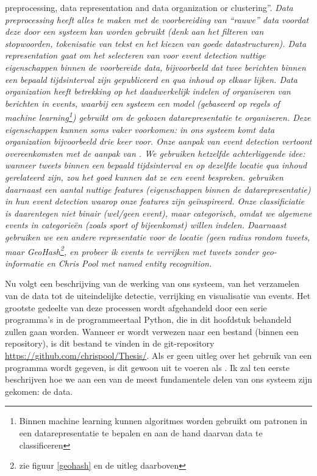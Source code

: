 {{{preprocessing, data representation and data organization or clustering''}. \it{Data 
preprocessing} heeft alles te maken met de voorbereiding van ``rauwe'' data voordat 
deze door een systeem kan worden gebruikt (denk aan het filteren van 
stopwoorden, tokenisatie van tekst en het kiezen van goede datastructuren). 
\it{Data representation} gaat om het selecteren van voor event detection nuttige 
eigenschappen binnen de voorbereide data, bijvoorbeeld dat twee berichten binnen 
een bepaald tijdsinterval zijn gepubliceerd en qua inhoud op elkaar lijken. \it{Data 
organization} heeft betrekking op het daadwerkelijk indelen of organiseren van 
berichten in events, waarbij een systeem een model (gebaseerd op regels of 
\it{machine learning}\footnote{Binnen machine learning kunnen algoritmes worden 
gebruikt om patronen in een datarepresentatie te bepalen en aan de hand daarvan
data te classificeren}) gebruikt om de gekozen datarepresentatie te organiseren. 
Deze eigenschappen kunnen soms vaker voorkomen: in ons systeem komt data organization
bijvoorbeeld drie keer voor.
\vl
Onze aanpak van event detection vertoont overeenkomsten met de aanpak van 
\citeauthor{walther2013geo}. We gebruiken hetzelfde achterliggende idee: wanneer tweets 
binnen een bepaald tijdsinterval en op dezelfde locatie qua inhoud gerelateerd 
zijn, zou het goed kunnen dat ze een event bespreken. \citeauthor{walther2013geo} gebruiken 
daarnaast een aantal nuttige \it{features} (eigenschappen binnen de datarepresentatie) in 
hun event detection waarop onze features zijn geïnspireerd. Onze classificiatie 
is daarentegen niet \it{binair} (wel/geen event), maar \it{categorisch}, omdat we algemene 
events in categorieën (zoals \it{sport} of \it{bijeenkomst}) willen indelen. Daarnaast gebruiken we een andere 
representatie voor de locatie (geen radius rondom tweets, maar \it{GeoHash}\footnote{zie 
figuur \ref{geohash} en de uitleg daarboven}, en probeer ik events te verrijken met tweets zonder geo-informatie en 
Chris Pool met named \it{entity recognition}.

\label{methode}

Nu volgt een beschrijving van de werking van ons systeem, van het verzamelen 
van de data tot de uiteindelijke detectie, verrijking en visualisatie van 
events. Het grootste gedeelte van deze processen wordt afgehandeld door een 
serie programma's in de programmeertaal Python, die in dit hoofdstuk behandeld 
zullen gaan worden. Wanneer er wordt verwezen naar een bestand (binnen een 
repository), is dit bestand te vinden in de git-repository 
\url{https://github.com/chrispool/Thesis/}. Als er geen uitleg over het gebruik 
van een programma wordt gegeven, is dit gewoon uit te voeren als 
. Ik zal ten eerste beschrijven hoe we aan een van de 
meest fundamentele delen van ons systeem zijn gekomen: de data.

}}
